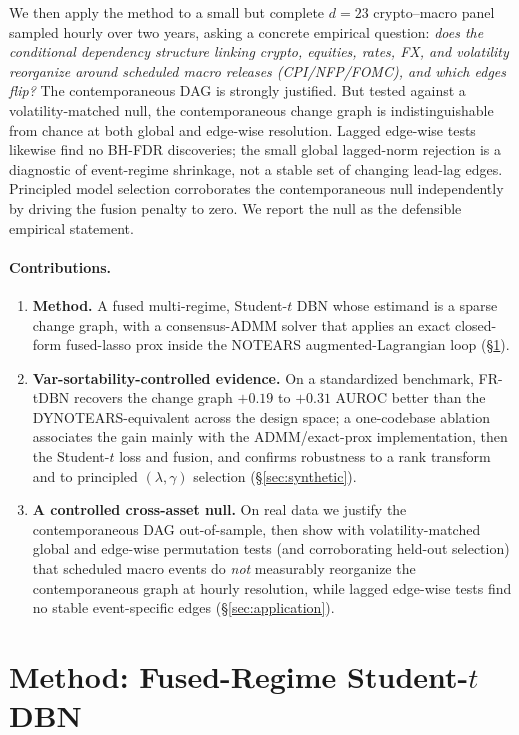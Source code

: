 \documentclass{article}
\begin{document}
We then apply the method to a small but complete $d=23$ crypto--macro panel sampled
hourly over two years, asking a concrete empirical question: \emph{does the
conditional dependency structure linking crypto, equities, rates, FX, and volatility
reorganize around scheduled macro releases (CPI/NFP/FOMC), and which edges flip?}
The contemporaneous DAG is strongly justified. But tested against a
volatility-matched null, the contemporaneous change graph is indistinguishable from
chance at both global and edge-wise resolution. Lagged edge-wise tests likewise
find no BH-FDR discoveries; the small global lagged-norm rejection is a diagnostic
of event-regime shrinkage, not a stable set of changing lead-lag edges. Principled
model selection corroborates the contemporaneous null independently by driving the
fusion penalty to zero. We report the null as the defensible empirical statement.

\paragraph{Contributions.}
\begin{enumerate}\itemsep2pt
  \item \textbf{Method.} A fused multi-regime, Student-$t$ DBN whose estimand is a
  sparse change graph, with a consensus-ADMM solver that applies an exact closed-form
  fused-lasso prox inside the NOTEARS augmented-Lagrangian loop (\S\ref{sec:method}).
  \item \textbf{Var-sortability-controlled evidence.} On a standardized benchmark,
  FR-tDBN recovers the change graph $+0.19$ to $+0.31$ AUROC better than the
  DYNOTEARS-equivalent across the design space; a one-codebase ablation associates
  the gain mainly with the ADMM/exact-prox implementation, then the Student-$t$ loss
  and fusion, and confirms robustness to a rank transform and to principled $(\lambda,\gamma)$
  selection (\S\ref{sec:synthetic}).
  \item \textbf{A controlled cross-asset null.} On real data we justify the
  contemporaneous DAG out-of-sample, then show with volatility-matched global and
  edge-wise permutation tests (and corroborating held-out selection) that scheduled
  macro events do \emph{not} measurably reorganize the contemporaneous graph at
  hourly resolution, while lagged edge-wise tests find no stable event-specific edges
  (\S\ref{sec:application}).
\end{enumerate}

\section{Method: Fused-Regime Student-$t$ DBN}
\label{sec:method}
\end{document}
